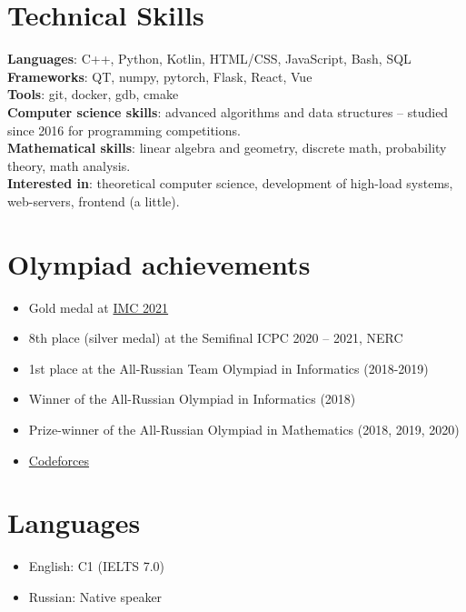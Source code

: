 \documentclass[letterpaper,11pt]{article}
\newcommand{\resumeItem}[1]{
    \item\small{
        {#1 \vspace{-2pt}}
    }
}
\newcommand{\resumeSubItem}[1]{\resumeItem{#1}\vspace{-4pt}}
\newcommand{\resumeItemListStart}{\begin{itemize}}
\newcommand{\resumeItemListEnd}{\end{itemize}\vspace{-5pt}}
\begin{document}
\section{Technical Skills}
\begin{itemize}[leftmargin=0.15in, label={}]
    \small{\item{
        \textbf{Languages}{: C++, Python, Kotlin, HTML/CSS, JavaScript, Bash, SQL} \\
        \textbf{Frameworks}{: QT, numpy, pytorch, Flask, React, Vue} \\
        \textbf{Tools}{: git, docker, gdb, cmake} \\
        \textbf{Computer science skills}{: advanced algorithms and data structures -- studied since 2016 for programming competitions.} \\
        \textbf{Mathematical skills}{: linear algebra and geometry, discrete math, probability theory, math analysis.} \\
        \textbf{Interested in}{: theoretical computer science, development of high-load systems, web-servers, frontend (a little).} \\
    }}
\end{itemize}
\vspace{-16pt}


\section{Olympiad achievements}
    \resumeItemListStart
        \resumeSubItem{Gold medal at \href{https://imc-math.org.uk/?year=2021}{IMC 2021}}
        \resumeSubItem{8th place (silver medal) at the Semifinal ICPC 2020 – 2021, NERC}
        \resumeSubItem{1st place at the All-Russian Team Olympiad in Informatics (2018-2019)}
        \resumeSubItem{Winner of the All-Russian Olympiad in Informatics (2018)}
        \resumeSubItem{Prize-winner of the All-Russian Olympiad in Mathematics (2018, 2019, 2020)}
        \resumeSubItem{\href{https://codeforces.com/profile/Kuyan}{Codeforces}}
    \resumeItemListEnd


\section{Languages}
    \resumeItemListStart
        \resumeSubItem{English: C1 (IELTS 7.0)}
        \resumeSubItem{Russian: Native speaker}
    \resumeItemListEnd
\end{document}
